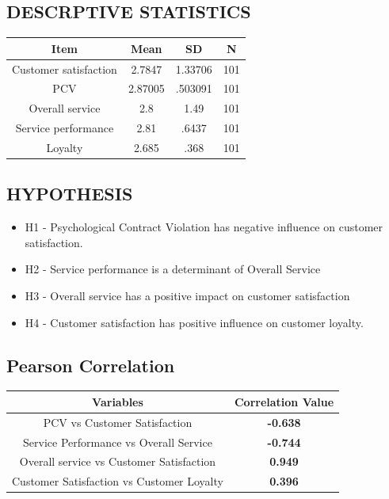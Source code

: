 \documentclass[a4paper, 14pt]{article}
\begin{document}
{\subsection*{DESCRPTIVE STATISTICS}
\begin{center}
\begin{tabular}{|c|c|c|c|}
\hline
Item & \textbf{Mean} & \textbf{SD} & N \\
\hline
Customer satisfaction & 2.7847 & 1.33706 & 101 \\
PCV & 2.87005 & .503091 & 101 \\
Overall service & 2.8 & 1.49 & 101 \\
Service performance & 2.81 & .6437 & 101 \\
Loyalty & 2.685 & .368 & 101 \\
\hline
\end{tabular}
\end{center}

\subsection*{HYPOTHESIS}
\begin{itemize}
\item H1 - Psychological Contract Violation has negative influence on customer satisfaction.
\item H2 - Service performance is a determinant of Overall Service
\item H3 - Overall service has a positive impact on customer satisfaction
\item H4 - Customer satisfaction has positive influence on customer loyalty.
\end{itemize}

\subsection*{Pearson Correlation}
\begin{center}
\begin{tabular}{|c|c|}
\hline
Variables & Correlation Value \\
\hline
PCV vs Customer Satisfaction & \textbf{-0.638} \\
Service Performance vs Overall Service & \textbf{-0.744} \\
Overall service vs Customer Satisfaction & \textbf{0.949} \\
Customer Satisfaction vs Customer Loyalty & \textbf{0.396} \\
\hline
\end{tabular}
\end{center}

}
\end{document}

